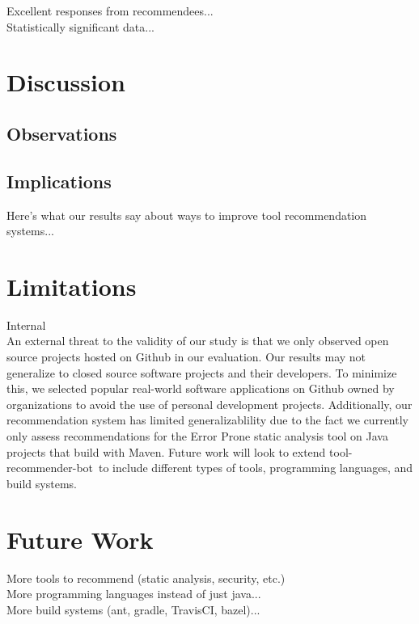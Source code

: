 \documentclass[conference]{IEEEtran}
\newcommand{\tool}{tool-recommender-bot}
\begin{document}
Excellent responses from recommendees...\\

Statistically significant data...

\section{Discussion}

\subsection{Observations}

\subsection{Implications}

Here's what our results say about ways to improve tool recommendation systems...

\section{Limitations}

Internal\\

An external threat to the validity of our study is that we only observed open source projects hosted on Github in our evaluation. Our results may not generalize to closed source software projects and their developers. To minimize this, we selected popular real-world software applications on Github owned by organizations to avoid the use of personal development projects. Additionally, our recommendation system has limited generalizablility due to the fact we currently only assess recommendations for the Error Prone static analysis tool on Java projects that build with Maven. Future work will look to extend \tool~to include different types of tools, programming languages, and build systems.

\section{Future Work}

More tools to recommend (static analysis, security, etc.) \\

More programming languages instead of just java...\\

More build systems (ant, gradle, TravisCI, bazel)...\\
\end{document}
